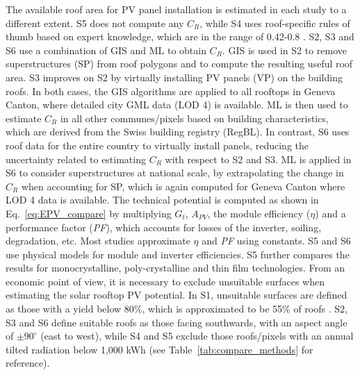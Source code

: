 The available roof area for PV panel installation is estimated in each study to a different extent. S5 does not compute any $C_R$, while S4 uses roof-specific rules of thumb based on expert knowledge, which are in the range of 0.42-0.8 \cite{portmann_sonnendach.ch:_2016}. S2, S3 and S6 use a combination of GIS and ML to obtain $C_R$. GIS is used in S2 to remove superstructures (SP) from roof polygons and to compute the resulting useful roof area. S3 improves on S2 by virtually installing PV panels (VP) on the building roofs. In both cases, the GIS algorithms are applied to all rooftops in Geneva Canton, where detailed city GML data (LOD 4) is available. ML is then used to estimate $C_R$ in all other communes/pixels based on building characteristics, which are derived from the Swiss building registry (RegBL). In contrast, S6 uses roof data for the entire country to virtually install panels, reducing the uncertainty related to estimating $C_R$ with respect to S2 and S3. ML is applied in S6 to consider superstructures at national scale, by extrapolating the change in $C_R$ when accounting for SP, which is again computed for Geneva Canton where LOD 4 data is available.
The technical potential is computed as shown in Eq.~\ref{eq:EPV_compare} by multiplying $G_t$, $A_{PV}$, the module efficiency ($\eta$) and a performance factor (\textit{PF}), which accounts for losses of the inverter, soiling, degradation, etc. Most studies approximate $\eta$ and \textit{PF} using constants. S5 and S6 use physical models for module and inverter efficiencies. S5 further compares the results for monocrystalline, poly-crystalline and thin film technologies. From an economic point of view, it is necessary to exclude unsuitable surfaces when estimating the solar rooftop PV potential. In S1, unsuitable surfaces are defined as those with a yield below 80\%, which is approximated to be 55\% of roofs \cite{iea_potential_2002}. S2, S3 and S6 define suitable roofs as those facing southwards, with an aspect angle of $\pm 90^\circ$ (east to west), while S4 and S5 exclude those roofs/pixels with an annual tilted radiation below 1,000 kWh (see Table~\ref{tab:compare_methods} for reference).

